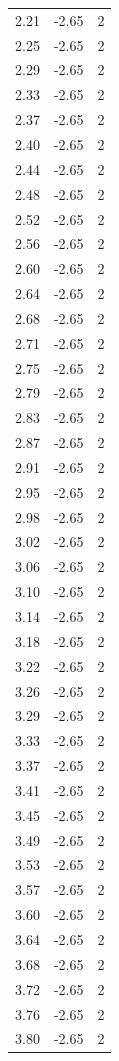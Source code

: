 \begin{longtable}{lrr}
  2.21 & -2.65 & 2 \\
  2.25 & -2.65 & 2 \\
  2.29 & -2.65 & 2 \\
  2.33 & -2.65 & 2 \\
  2.37 & -2.65 & 2 \\
  2.40 & -2.65 & 2 \\
  2.44 & -2.65 & 2 \\
  2.48 & -2.65 & 2 \\
  2.52 & -2.65 & 2 \\
  2.56 & -2.65 & 2 \\
  2.60 & -2.65 & 2 \\
  2.64 & -2.65 & 2 \\
  2.68 & -2.65 & 2 \\
  2.71 & -2.65 & 2 \\
  2.75 & -2.65 & 2 \\
  2.79 & -2.65 & 2 \\
  2.83 & -2.65 & 2 \\
  2.87 & -2.65 & 2 \\
  2.91 & -2.65 & 2 \\
  2.95 & -2.65 & 2 \\
  2.98 & -2.65 & 2 \\
  3.02 & -2.65 & 2 \\
  3.06 & -2.65 & 2 \\
  3.10 & -2.65 & 2 \\
  3.14 & -2.65 & 2 \\
  3.18 & -2.65 & 2 \\
  3.22 & -2.65 & 2 \\
  3.26 & -2.65 & 2 \\
  3.29 & -2.65 & 2 \\
  3.33 & -2.65 & 2 \\
  3.37 & -2.65 & 2 \\
  3.41 & -2.65 & 2 \\
  3.45 & -2.65 & 2 \\
  3.49 & -2.65 & 2 \\
  3.53 & -2.65 & 2 \\
  3.57 & -2.65 & 2 \\
  3.60 & -2.65 & 2 \\
  3.64 & -2.65 & 2 \\
  3.68 & -2.65 & 2 \\
  3.72 & -2.65 & 2 \\
  3.76 & -2.65 & 2 \\
  3.80 & -2.65 & 2 \\

\end{longtable}
